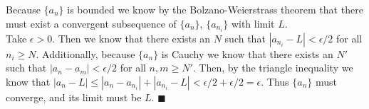     Because $\{a_n\}$ is bounded we know by the Bolzano-Weierstrass theorem that there must 
    exist a convergent subsequence of $\{a_n\}$, $\{a_{n_i}\}$ with limit $L$.\\

    Take $\epsilon > 0$. Then we know that there exists an $N$ such that $|a_{n_i} - L| < 
    \epsilon/2$ for all $n_i \geq N$. Additionally, because $\{a_n\}$ is Cauchy we know that
    there exists an $N'$ such that $|a_n - a_m| < \epsilon/2$ for all $n,m \geq N'$. Then, by
    the triangle inequality we know that $|a_n - L| \leq |a_n - a_{n_i}| + |a_{n_i} - L| < 
    \epsilon/2 + \epsilon/2 = \epsilon$. Thus $\{a_n\}$ must converge, and its limit must be
    $L$. $\blacksquare$

